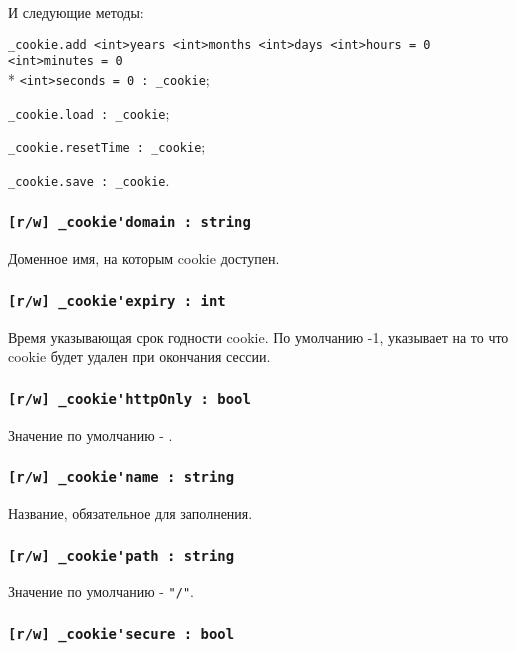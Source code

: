 И следующие методы:
\begin{icItems}
	\item \lstinline|_cookie.add <int>years <int>months <int>days <int>hours = 0 <int>minutes = 0|\\* \lstinline|<int>seconds = 0 : _cookie|;
	\item \lstinline|_cookie.load : _cookie|;
	\item \lstinline|_cookie.resetTime : _cookie|;
	\item \lstinline|_cookie.save : _cookie|.
\end{icItems}

\subsubsection{\lstinline|[r/w] _cookie'domain : string|}

Доменное имя, на которым cookie доступен.

\subsubsection{\lstinline|[r/w] _cookie'expiry : int|}

Время указывающая срок годности cookie. По умолчанию -1, указывает на то что cookie будет удален при окончания сессии.

\subsubsection{\lstinline|[r/w] _cookie'httpOnly : bool|}

Значение по умолчанию - \false.

\subsubsection{\lstinline|[r/w] _cookie'name : string|}

Название, обязательное для заполнения.

\subsubsection{\lstinline|[r/w] _cookie'path : string|}

Значение по умолчанию - \lstinline|"/"|.

\subsubsection{\lstinline|[r/w] _cookie'secure : bool|}

